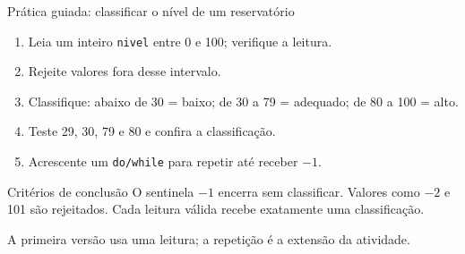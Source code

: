 \begin{frame}{Prática guiada: classificar o nível de um reservatório}
\begin{enumerate}
\item Leia um inteiro \texttt{nivel} entre 0 e 100; verifique a leitura.
\item Rejeite valores fora desse intervalo.
\item Classifique: abaixo de 30 = baixo; de 30 a 79 = adequado; de 80 a 100 = alto.
\item Teste 29, 30, 79 e 80 e confira a classificação.
\item Acrescente um \texttt{do/while} para repetir até receber $-1$.
\end{enumerate}
\begin{block}{Critérios de conclusão}
O sentinela $-1$ encerra sem classificar. Valores como $-2$ e 101 são rejeitados. Cada leitura válida recebe exatamente uma classificação.
\end{block}
\small A primeira versão usa uma leitura; a repetição é a extensão da atividade.
\end{frame}
